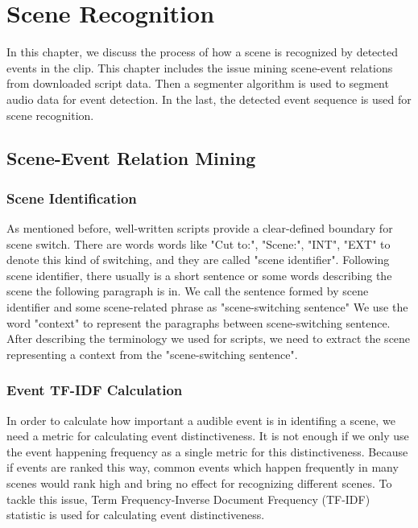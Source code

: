 \chapter{Scene Recognition}
In this chapter, we discuss the process of how a scene is recognized by detected events in the clip. 
This chapter includes the issue mining scene-event relations from downloaded script data.
Then a segmenter algorithm is used to segment audio data for event detection. 
In the last, the detected event sequence is used for scene recognition. 

\section{Scene-Event Relation Mining}
\subsection{Scene Identification}
As mentioned before, well-written scripts provide a clear-defined boundary for scene switch. 
There are words words like "Cut to:", "Scene:", "INT", "EXT" to denote this kind of switching, and they are called "scene identifier".  
Following scene identifier, there usually is a short sentence or some words describing the scene the following paragraph is in. 
We call the sentence formed by scene identifier and some scene-related phrase as "scene-switching sentence"
We use the word "context" to represent the paragraphs between scene-switching sentence. \\ 


After describing the terminology we used for scripts, we need to extract the scene representing a context from the "scene-switching sentence". 


\subsection{Event TF-IDF Calculation}
In order to calculate how important a audible event is in identifing a scene, we need a metric for calculating event distinctiveness. 
It is not enough if we only use the event happening frequency as a single metric for this distinctiveness. 
Because if events are ranked this way, common events which happen frequently in many scenes would rank high and bring no effect for recognizing different scenes. 
To tackle this issue, Term Frequency-Inverse Document Frequency (TF-IDF) statistic is used for calculating event distinctiveness. \\ 

